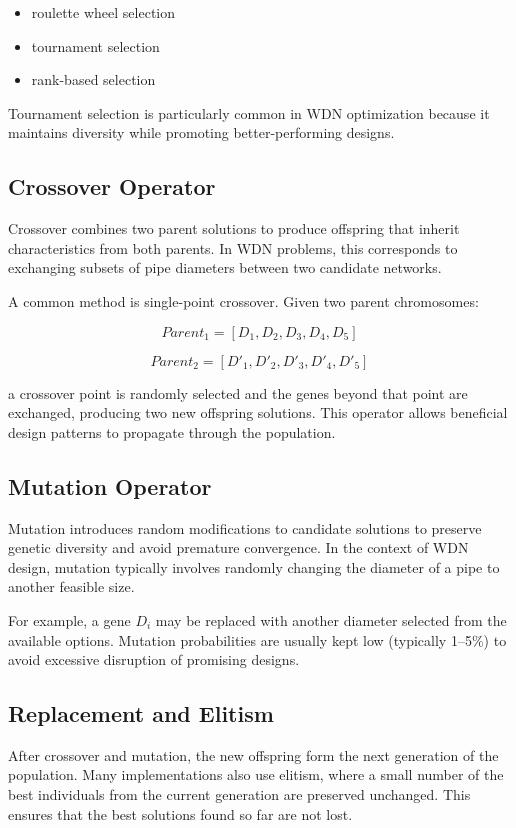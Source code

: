\documentclass[12pt, a4paper]{article}
\begin{document}
\begin{itemize}
	\item roulette wheel selection
	\item tournament selection
	\item rank-based selection
\end{itemize}

Tournament selection is particularly common in WDN optimization because it maintains diversity while promoting better-performing designs.

\subsection*{Crossover Operator}

Crossover combines two parent solutions to produce offspring that inherit characteristics from both parents. In WDN problems, this corresponds to exchanging subsets of pipe diameters between two candidate networks.

A common method is single-point crossover. Given two parent chromosomes:

\[
	Parent_1 = [D_1, D_2, D_3, D_4, D_5]
\]

\[
	Parent_2 = [D'_1, D'_2, D'_3, D'_4, D'_5]
\]

a crossover point is randomly selected and the genes beyond that point are exchanged, producing two new offspring solutions. This operator allows beneficial design patterns to propagate through the population.

\subsection*{Mutation Operator}

Mutation introduces random modifications to candidate solutions to preserve genetic diversity and avoid premature convergence. In the context of WDN design, mutation typically involves randomly changing the diameter of a pipe to another feasible size.

For example, a gene $D_i$ may be replaced with another diameter selected from the available options. Mutation probabilities are usually kept low (typically 1--5\%) to avoid excessive disruption of promising designs.

\subsection*{Replacement and Elitism}

After crossover and mutation, the new offspring form the next generation of the population. Many implementations also use elitism, where a small number of the best individuals from the current generation are preserved unchanged. This ensures that the best solutions found so far are not lost.
\end{document}
